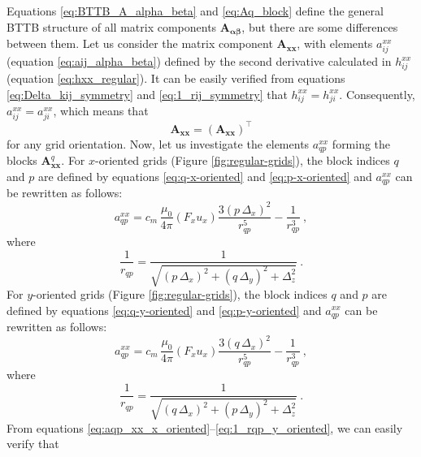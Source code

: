 \documentclass[manuscript,noblind]{geophysics}
\begin{document}
Equations \ref{eq:BTTB_A_alpha_beta} and \ref{eq:Aq_block} define the general BTTB
structure of all matrix components $\mathbf{A_{\boldsymbol{\alpha\beta}}}$, but 
there are some differences between them.
Let us consider the matrix component $\mathbf{A}_{\boldsymbol{xx}}$, with elements
$a^{xx}_{ij}$ (equation \ref{eq:aij_alpha_beta}) defined by the second derivative calculated in
$h^{xx}_{ij}$ (equation \ref{eq:hxx_regular}). It can be easily verified from equations
\ref{eq:Delta_kij_symmetry} and \ref{eq:1_rij_symmetry} that $h^{xx}_{ij} = h^{xx}_{ji}$.
Consequently, $a^{xx}_{ij} = a^{xx}_{ji}$, which means that 
\begin{equation}
	\mathbf{A}_{\boldsymbol{xx}} = \left( \mathbf{A}_{\boldsymbol{xx}} \right)^{\top}
	\label{eq:Axx_symmetry}
\end{equation}
for any grid orientation.
Now, let us investigate the elements $a^{xx}_{qp}$ forming the blocks $\mathbf{A}_{\boldsymbol{xx}}^{q}$.
For $x$-oriented grids (Figure \ref{fig:regular-grids}), the block indices $q$ and $p$ are defined 
by equations \ref{eq:q-x-oriented} and 
\ref{eq:p-x-oriented} and $a^{xx}_{qp}$ can be rewritten as follows:
\begin{equation}
	a^{xx}_{qp} = c_{m} \, \frac{\mu_{0}}{4\pi} 
	\left( F_{x} u_{x} \right) \frac{3 \left( p \, \Delta_{x} \right)^{2}}{r_{qp}^{5}} - 
	\frac{1}{r_{qp}^{3}} \: ,
	\label{eq:aqp_xx_x_oriented}
\end{equation}
where
\begin{equation}
	\frac{1}{r_{qp}} = 
	\frac{1}{\sqrt{\left( p \, \Delta_{x} \right)^{2} + \left( q \, \Delta_{y} \right)^{2} + \Delta_{z}^{2}}} \: .
	\label{eq:1_rqp_x_oriented}
\end{equation}
For $y$-oriented grids (Figure \ref{fig:regular-grids}), the block indices $q$ and $p$ are 
defined by equations \ref{eq:q-y-oriented} and 
\ref{eq:p-y-oriented} and $a^{xx}_{qp}$ can be rewritten as follows:
\begin{equation}
	a^{xx}_{qp} = c_{m} \, \frac{\mu_{0}}{4\pi} 
	\left( F_{x} u_{x} \right) \frac{3 \left( q \, \Delta_{x} \right)^{2}}{r_{qp}^{5}} - 
	\frac{1}{r_{qp}^{3}} \: ,
	\label{eq:aqp_xx_y_oriented}
\end{equation}
where
\begin{equation}
	\frac{1}{r_{qp}} = 
	\frac{1}{\sqrt{\left( q \, \Delta_{x} \right)^{2} + \left( p \, \Delta_{y} \right)^{2} + \Delta_{z}^{2}}} \: .
	\label{eq:1_rqp_y_oriented}
\end{equation}
From equations \ref{eq:aqp_xx_x_oriented}--\ref{eq:1_rqp_y_oriented}, we can easily verify that
\end{document}

